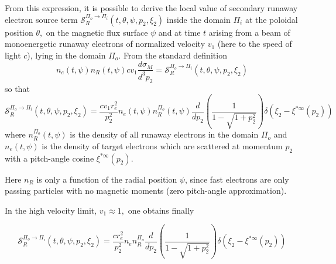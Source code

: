 From this expression, it is possible to derive the local value of secondary
runaway electron source term $\mathcal{S}_{R}^{\Pi _{o}\rightarrow \Pi
_{i}}\left( t,\theta ,\psi ,p_{2},\xi _{2}\right) $ inside the domain $\Pi
_{i}$ at the poloidal position $\theta ,$ on the magnetic flux surface $\psi 
$ and at time $t$ arising from a beam of monoenergetic runaway electrons of
normalized velocity $v_{1}$ (here to the speed of light $c$), lying in the
domain $\Pi _{o}.$ From the standard definition 
\begin{equation}
n_{e}\left( t,\psi \right) n_{R}\left( t,\psi \right) cv_{1}\frac{d\sigma
_{M}}{d^{3}p_{2}}=\mathcal{S}_{R}^{\Pi _{o}\rightarrow \Pi _{i}}\left(
t,\theta ,\psi ,p_{2},\xi _{2}\right) 
\end{equation}%
so that 
\begin{equation}
\mathcal{S}_{R}^{\Pi _{o}\rightarrow \Pi _{i}}\left( t,\theta ,\psi
,p_{2},\xi _{2}\right) =\frac{cv_{1}r_{e}^{2}}{p_{2}^{2}}n_{e}\left( t,\psi
\right) n_{R}^{\Pi _{o}}\left( t,\psi \right) \frac{d}{dp_{2}}\left( \frac{1%
}{1-\sqrt{1+p_{2}^{2}}}\right) \delta \left( \xi _{2}-\xi ^{\ast \infty
}\left( p_{2}\right) \right) 
\end{equation}%
where $n_{R}^{\Pi _{o}}\left( t,\psi \right) $ is the density of all runaway
electrons in the domain $\Pi _{o}$ and $n_{e}\left( t,\psi \right) $ is the
density of target electrons which are scattered at momentum $p_{2}$ with a
pitch-angle cosine $\xi ^{\ast \infty }\left( p_{2}\right) $. \strut Here $%
n_{R}$ is only a function of the radial position $\psi $, since fast
electrons are only passing particles with no magnetic moments (zero
pitch-angle approximation).

In the high velocity limit, $v_{1}\approx 1,$ one obtains finally

\begin{equation}
\mathcal{S}_{R}^{\Pi _{o}\rightarrow \Pi _{i}}\left( t,\theta ,\psi
,p_{2},\xi _{2}\right) =\frac{cr_{e}^{2}}{p_{2}^{2}}n_{e}n_{R}^{\Pi _{o}}%
\frac{d}{dp_{2}}\left( \frac{1}{1-\sqrt{1+p_{2}^{2}}}\right) \delta \left(
\xi _{2}-\xi ^{\ast \infty }\left( p_{2}\right) \right) 
\end{equation}

